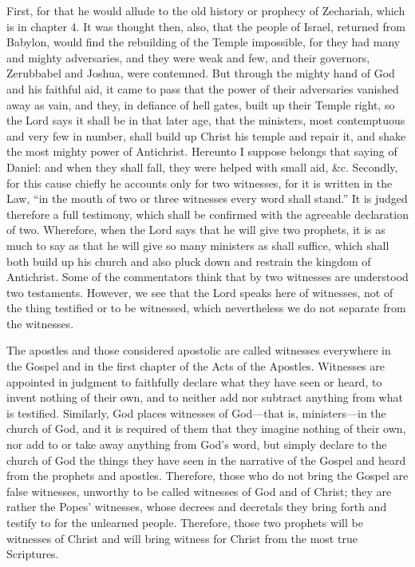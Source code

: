 First, for that he would allude to the old history or prophecy of Zechariah, which is in chapter 4. It was thought then, also, that the people of Israel, returned from Babylon, would find the rebuilding of the Temple impossible, for they had many and mighty adversaries, and they were weak and few, and their governors, Zerubbabel and Joshua, were contemned. But through the mighty hand of God and his faithful aid, it came to pass that the power of their adversaries vanished away as vain, and they, in defiance of hell gates, built up their Temple right, so the Lord says it shall be in that later age, that the ministers, most contemptuous and very few in number, shall build up Christ his temple and repair it, and shake the most mighty power of Antichrist. Hereunto I suppose belongs that saying of Daniel: and when they shall fall, they were helped with small aid, \&c. Secondly, for this cause chiefly he accounts only for two witnesses, for it is written in the Law, “in the mouth of two or three witnesses every word shall stand.” It is judged therefore a full testimony, which shall be confirmed with the agreeable declaration of two. Wherefore, when the Lord says that he will give two prophets, it is as much to say as that he will give so many ministers as shall suffice, which shall both build up his church and also pluck down and restrain the kingdom of Antichrist. Some of the commentators think that by two witnesses are understood two testaments. However, we see that the Lord speaks here of witnesses, not of the thing testified or to be witnessed, which nevertheless we do not separate from the witnesses.

The apostles and those considered apostolic are called witnesses everywhere in the Gospel and in the first chapter of the Acts of the Apostles. Witnesses are appointed in judgment to faithfully declare what they have seen or heard, to invent nothing of their own, and to neither add nor subtract anything from what is testified. Similarly, God places witnesses of God—that is, ministers—in the church of God, and it is required of them that they imagine nothing of their own, nor add to or take away anything from God’s word, but simply declare to the church of God the things they have seen in the narrative of the Gospel and heard from the prophets and apostles. Therefore, those who do not bring the Gospel are false witnesses, unworthy to be called witnesses of God and of Christ; they are rather the Popes’ witnesses, whose decrees and decretals they bring forth and testify to for the unlearned people. Therefore, those two prophets will be witnesses of Christ and will bring witness for Christ from the most true Scriptures.

